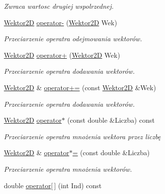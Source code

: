 \begin{DoxyCompactItemize}
\begin{DoxyCompactList}\small\item\em Zwraca wartosc drugiej wspolrzednej. \end{DoxyCompactList}\item 
\hyperlink{class_wektor2_d}{Wektor2\+D} \hyperlink{class_wektor2_d_a60084e6217b27dcac7a18e0fc220181a}{operator-\/} (\hyperlink{class_wektor2_d}{Wektor2\+D} Wek)
\begin{DoxyCompactList}\small\item\em Przeciarzenie operatra odejmowania wektorów. \end{DoxyCompactList}\item 
\hyperlink{class_wektor2_d}{Wektor2\+D} \hyperlink{class_wektor2_d_af452ceb01296d1b2a00104ef169b5380}{operator+} (\hyperlink{class_wektor2_d}{Wektor2\+D} Wek)
\begin{DoxyCompactList}\small\item\em Przeciarzenie operatra dodawania wektorów. \end{DoxyCompactList}\item 
\hyperlink{class_wektor2_d}{Wektor2\+D} \& \hyperlink{class_wektor2_d_a839baa1a65b81fa76457323f1142ba81}{operator+=} (const \hyperlink{class_wektor2_d}{Wektor2\+D} \&Wek)
\begin{DoxyCompactList}\small\item\em Przeciarzenie operatra dodawania wektorów. \end{DoxyCompactList}\item 
\hyperlink{class_wektor2_d}{Wektor2\+D} \hyperlink{class_wektor2_d_aa64a35f3ce8e2c2c5aa0144ea76a6765}{operator$\ast$} (const double \&Liczba) const 
\begin{DoxyCompactList}\small\item\em Przeciarzenie operatra mnożenia wektora przez liczbę \end{DoxyCompactList}\item 
\hyperlink{class_wektor2_d}{Wektor2\+D} \& \hyperlink{class_wektor2_d_ad4d5d857b01f9078c21a136fb0fbad28}{operator$\ast$=} (const double \&Liczba)
\begin{DoxyCompactList}\small\item\em Przeciarzenie operatra mnożenia wektorów. \end{DoxyCompactList}\item 
\hypertarget{class_wektor2_d_ad02b05aa715c7c5f52b11a45af33a725}{double \hyperlink{class_wektor2_d_ad02b05aa715c7c5f52b11a45af33a725}{operator\mbox{[}$\,$\mbox{]}} (int Ind) const }\label{class_wektor2_d_ad02b05aa715c7c5f52b11a45af33a725}


\end{DoxyCompactItemize}
